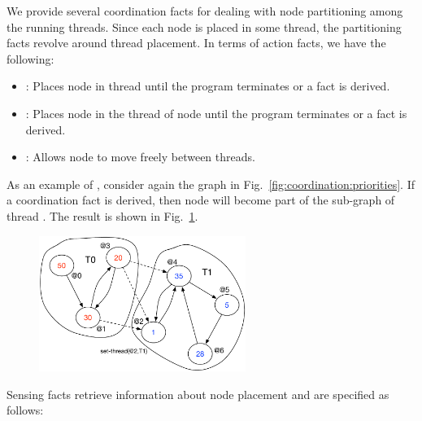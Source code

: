 We provide several coordination facts for dealing with node partitioning among
the running threads. Since each node is placed in some thread, the partitioning
facts revolve around thread placement.  In terms of action facts, we have the
following:

\begin{itemize}
   \item {}: Places node  in thread  until the program terminates or a  fact is derived.
      
   \item {}: Places node  in the thread
      of node  until the program terminates or a  fact is derived.

   \item {}: Allows node  to move freely
   between threads.

\end{itemize}

As an example of , consider again the graph in
Fig.~\ref{fig:coordination:priorities}. If a coordination fact
 is derived, then node  will become part
of the sub-graph of thread . The result is shown in
Fig.~\ref{fig:coordination:partitioning}.

\begin{figure}
\begin{center}
   \includegraphics[width=0.6\textwidth]{figures/coordination/partitioning.pdf}
\end{center}
\label{fig:coordination:partitioning}
\end{figure}

Sensing facts retrieve information about node placement and are specified as
follows:

